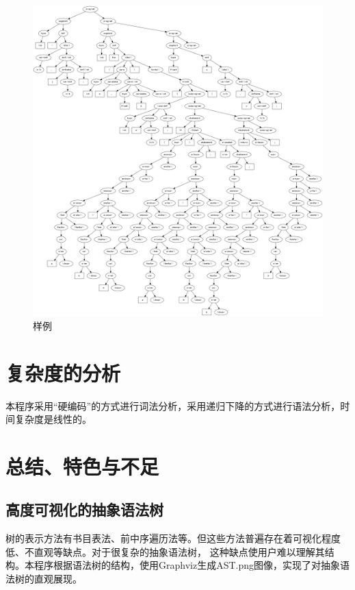 \documentclass[supercite]{Experimental_Report}
\theoremstyle{definition}
\begin{document}
\newpage
\begin{figure}[htb]
	\begin{center}
		\includegraphics[scale=0.2]{images/样例.png}
		\caption{样例}
		\label{fig3-7}
	\end{center}
\end{figure}
\newpage
\section{复杂度的分析}
本程序采用“硬编码”的方式进行词法分析，采用递归下降的方式进行语法分析，时间复杂度是线性的。

\section{总结、特色与不足}


% 
% 
\subsection{高度可视化的抽象语法树}
树的表示方法有书目表法、前中序遍历法等。但这些方法普遍存在着可视化程度低、不直观等缺点。对于很复杂的抽象语法树，
这种缺点使用户难以理解其结构。本程序根据语法树的结构，使用Graphviz生成AST.png图像，实现了对抽象语法树的直观展现。
\end{document}
